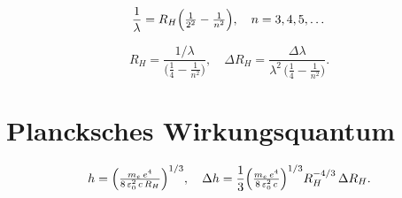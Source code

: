 \begin{equation}
  \frac{1}{\lambda}
  = R_H\Bigl(\tfrac{1}{2^{2}} - \tfrac{1}{n^{2}}\Bigr),
  \quad n=3,4,5,\dots
\end{equation}

\begin{equation}
  R_H
  = \frac{1/\lambda}{\bigl(\tfrac{1}{4} - \tfrac{1}{n^{2}}\bigr)},
  \quad
  \Delta R_H
  = \frac{\Delta\lambda}{\lambda^{2}\,\bigl(\tfrac{1}{4} - \tfrac{1}{n^{2}}\bigr)}.
\end{equation}

\section*{Plancksches Wirkungsquantum}

\begin{equation}
  h
  = \Bigl(\tfrac{m_e\,e^{4}}{8\,\varepsilon_{0}^{2}\,c\,R_H}\Bigr)^{1/3},
  \quad
  \Delta h
  = \frac{1}{3}
    \Bigl(\tfrac{m_e\,e^{4}}{8\,\varepsilon_{0}^{2}\,c}\Bigr)^{1/3}
    R_H^{-4/3}\,\Delta R_H.
\end{equation}
